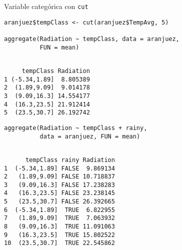 \documentclass[aspectratio=169, usenames,svgnames,dvipsnames]{beamer}
\begin{document}
\begin{frame}[label={sec:orgf02d5be},fragile]{Variable categórica con \texttt{cut}}
 \lstset{language=r,label= ,caption= ,captionpos=b,numbers=none}
\begin{lstlisting}
aranjuez$tempClass <- cut(aranjuez$TempAvg, 5)

aggregate(Radiation ~ tempClass, data = aranjuez,
          FUN = mean)
\end{lstlisting}

\begin{verbatim}

     tempClass Radiation
1 (-5.34,1.89]  8.805389
2  (1.89,9.09]  9.014178
3  (9.09,16.3] 14.554177
4  (16.3,23.5] 21.912414
5  (23.5,30.7] 26.192742
\end{verbatim}


\lstset{language=r,label= ,caption= ,captionpos=b,numbers=none}
\begin{lstlisting}
aggregate(Radiation ~ tempClass + rainy,
          data = aranjuez, FUN = mean)
\end{lstlisting}

\begin{verbatim}

      tempClass rainy Radiation
1  (-5.34,1.89] FALSE  9.869134
2   (1.89,9.09] FALSE 10.718837
3   (9.09,16.3] FALSE 17.238283
4   (16.3,23.5] FALSE 23.238145
5   (23.5,30.7] FALSE 26.392665
6  (-5.34,1.89]  TRUE  6.822955
7   (1.89,9.09]  TRUE  7.063932
8   (9.09,16.3]  TRUE 11.091063
9   (16.3,23.5]  TRUE 15.802522
10  (23.5,30.7]  TRUE 22.545862
\end{verbatim}
\end{frame}
\end{document}
